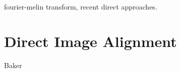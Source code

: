 fourier-melin transform,
recent direct approaches.

\section{Direct Image Alignment}%
\label{sec:direct-image-alignment}

Baker



%
%

%
%
%


